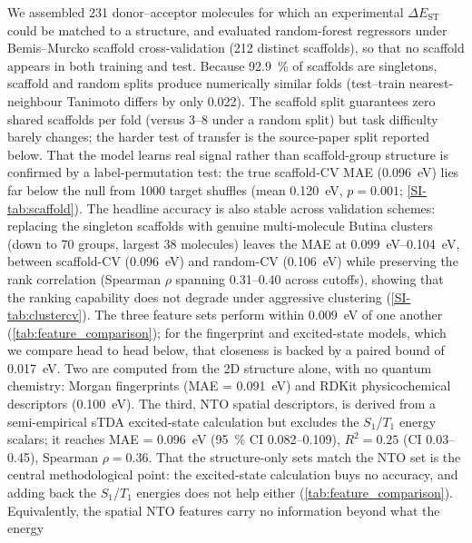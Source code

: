 We assembled \num{231} donor--acceptor molecules for which an experimental
$\Delta E_\text{ST}$ could be matched to a structure, and evaluated random-forest
regressors under Bemis--Murcko scaffold cross-validation (\num{212} distinct
scaffolds), so that no scaffold appears in both training and test.
Because \qty{92.9}{\percent} of scaffolds are singletons, scaffold and random splits
produce numerically similar folds (test--train nearest-neighbour Tanimoto differs by
only \num{0.022}). The scaffold split guarantees zero shared scaffolds per fold
(versus \numrange{3}{8} under a random split) but task difficulty barely changes;
the harder test of transfer is the source-paper split reported below.
That the model learns real signal rather than
scaffold-group structure is confirmed by a label-permutation test: the true
scaffold-CV MAE (\qty{0.096}{\electronvolt}) lies far below the null from
\num{1000} target shuffles (mean \qty{0.120}{\electronvolt}, $p = 0.001$;
\cref{SI-tab:scaffold}).
The headline accuracy is also stable across validation schemes: replacing the singleton
scaffolds with genuine multi-molecule Butina clusters (down to \num{70} groups, largest
\num{38} molecules) leaves the MAE at \qtyrange{0.099}{0.104}{\electronvolt}, between
scaffold-CV (\qty{0.096}{\electronvolt}) and random-CV (\qty{0.106}{\electronvolt})
while preserving the rank correlation (Spearman $\rho$ spanning \numrange{0.31}{0.40} across cutoffs), showing that the ranking capability does not degrade under aggressive clustering
(\cref{SI-tab:clustercv}).
The three feature sets perform within \qty{0.009}{\electronvolt} of one another
(\cref{tab:feature_comparison}); for the fingerprint and excited-state models, which we
compare head to head below, that closeness is backed by a paired bound of
\qty{0.017}{\electronvolt}. Two are computed from the 2D structure alone, with
no quantum chemistry: Morgan fingerprints (MAE = \qty{0.091}{\electronvolt}) and
RDKit physicochemical descriptors (\qty{0.100}{\electronvolt}). The third, NTO spatial
descriptors, is derived from a semi-empirical sTDA excited-state calculation but
excludes the $S_1$/$T_1$ energy scalars; it reaches MAE = \qty{0.096}{\electronvolt}
(\qty{95}{\percent} CI \numrange{0.082}{0.109}), $R^2 = 0.25$ (CI
\numrange{0.03}{0.45}), Spearman $\rho = 0.36$.
That the structure-only sets match the NTO set is the central methodological point:
the excited-state calculation buys no accuracy, and adding back the $S_1$/$T_1$ energies
does not help either (\cref{tab:feature_comparison}).
Equivalently, the spatial NTO features carry no information beyond what the energy
